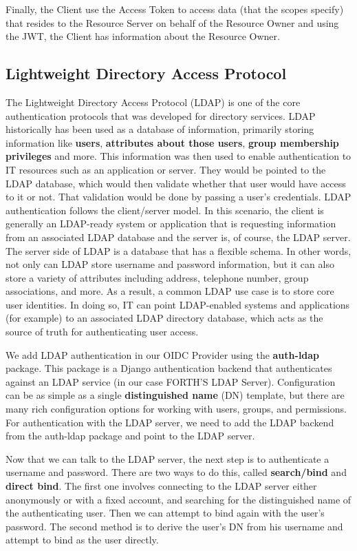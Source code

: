Finally, the Client use the Access Token to access data (that the scopes specify) that resides to the Resource Server on behalf of the Resource Owner and using the JWT, the Client has information about the Resource Owner.
	

\subsection{Lightweight Directory Access Protocol}

The Lightweight Directory Access Protocol (LDAP) is one of the core authentication protocols that was developed for directory services. LDAP historically has been used as a database of information, primarily storing information like \textbf{users}, \textbf{attributes about those users}, \textbf{group membership privileges} and more. This information was then used to enable authentication to IT resources such as an application or server. They would be pointed to the LDAP database, which would then validate whether that user would have access to it or not. That validation would be done by passing a user’s credentials. LDAP authentication follows the client/server model. In this scenario, the client is generally an LDAP-ready system or application that is requesting information from an associated LDAP database and the server is, of course, the LDAP server. The server side of LDAP is a database that has a flexible schema. In other words, not only can LDAP store username and password information, but it can also store a variety of attributes including address, telephone number, group associations, and more. As a result, a common LDAP use case is to store core user identities. In doing so, IT can point LDAP-enabled systems and applications (for example) to an associated LDAP directory database, which acts as the source of truth for authenticating user access.

We add LDAP authentication in our OIDC Provider using the \textbf{auth-ldap} \cite{ldapauth} package. This package is a Django authentication backend that authenticates against an LDAP service (in our case FORTH'S LDAP Server). Configuration can be as simple as a single \textbf{distinguished name} (DN) template, but there are many rich configuration options for working with users, groups, and permissions. For authentication with the LDAP server, we need to add the LDAP backend from the auth-ldap package and point to the LDAP server.

Now that we can talk to the LDAP server, the next step is to authenticate a username and password. There are two ways to do this, called \textbf{search/bind} and \textbf{direct bind}. The first one involves connecting to the LDAP server either anonymously or with a fixed account, and searching for the distinguished name of the authenticating user. Then we can attempt to bind again with the user’s password. The second method is to derive the user’s DN from his username and attempt to bind as the user directly.

